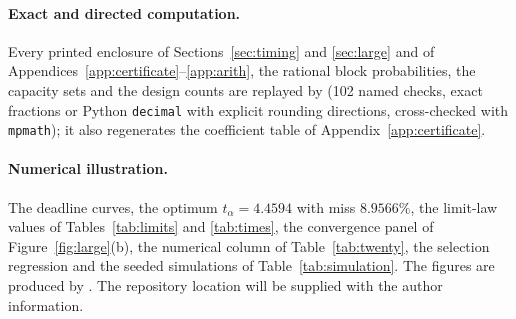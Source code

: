 \documentclass[11pt,a4paper]{article}
\newcommand{\RepositoryNote}{The repository location will be supplied with the author information.}
\theoremstyle{plain}
\theoremstyle{definition}
\theoremstyle{remark}
\begin{document}
\paragraph{Exact and directed computation.}
Every printed enclosure of Sections~\ref{sec:timing} and \ref{sec:large} and of Appendices~\ref{app:certificate}--\ref{app:arith}, the rational block probabilities, the capacity sets and the design counts are replayed by  (102 named checks, exact fractions or Python \texttt{decimal} with explicit rounding directions, cross-checked with \texttt{mpmath}); it also regenerates the coefficient table of Appendix~\ref{app:certificate}.

\paragraph{Numerical illustration.}
The deadline curves, the optimum $t_\alpha=4.4594$ with miss $8.9566\%$, the limit-law values of Tables~\ref{tab:limits} and \ref{tab:times}, the convergence panel of Figure~\ref{fig:large}(b), the numerical column of Table~\ref{tab:twenty}, the selection regression and the seeded simulations of Table~\ref{tab:simulation}. The figures are produced by . \RepositoryNote

\appendix
\end{document}
